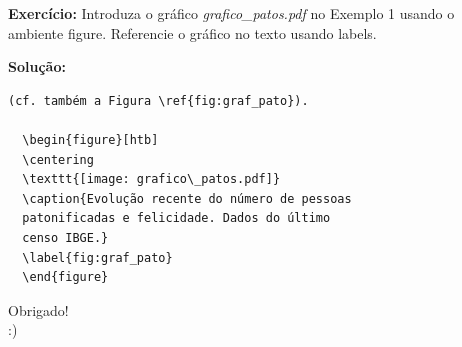 \documentclass[12pt]{beamer}
\begin{document}
\begin{frame}[fragile]
\textbf{Exercício: } Introduza o gráfico 
 \emph{grafico\_patos.pdf} no Exemplo 1 usando o ambiente figure. Referencie o gráfico no texto usando labels.

\pause

\textbf{Solução: }
\begin{verbatim}
(cf. também a Figura \ref{fig:graf_pato}).
  
  \begin{figure}[htb]
  \centering
  \texttt{[image: grafico\_patos.pdf]}
  \caption{Evolução recente do número de pessoas
  patonificadas e felicidade. Dados do último
  censo IBGE.}
  \label{fig:graf_pato}
  \end{figure}
\end{verbatim}

\end{frame}

\begin{frame}
  \begin{center}
    \large Obrigado!\\
    :)
  \end{center}
\end{frame}
\end{document}
